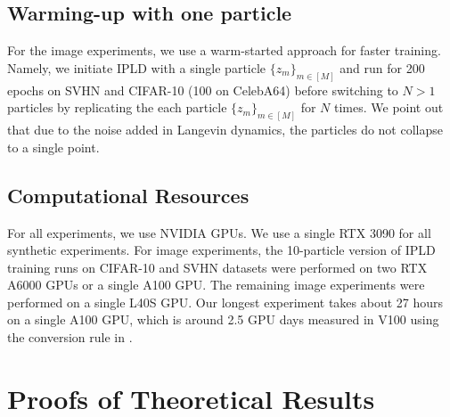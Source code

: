 \subsection{Warming-up with one particle}
\label{app:warm_start}
For the image experiments, we use a warm-started approach \citep{kuntz23a} for faster training. Namely, we initiate \gls*{IPLD} with a single particle $\{z_{m}\}_{m \in [M]}$ and run  for 200 epochs on SVHN and CIFAR-10 (100 on CelebA64) before switching to $N>1$ particles by replicating the each particle $\{z_{m}\}_{m \in [M]}$ for $N$ times. We point out that due to the noise added in Langevin dynamics, the particles do not collapse to a single point.

\subsection{Computational Resources}
\label{app:computational_considerations}
For all experiments, we use NVIDIA GPUs. We use a single RTX 3090 for all synthetic experiments. For image experiments, the 10-particle version of \gls*{IPLD} training runs on CIFAR-10 and SVHN datasets were performed on two RTX A6000 GPUs or a single A100 GPU. The remaining image experiments were performed on a single L40S GPU. Our longest experiment takes about 27 hours on a single A100 GPU, which is around 2.5 GPU days measured in V100 using the conversion rule in \citet{rombachhighresolutionimagesynthesis2022}.


\section{Proofs of Theoretical Results}
\label{app:proofs}

